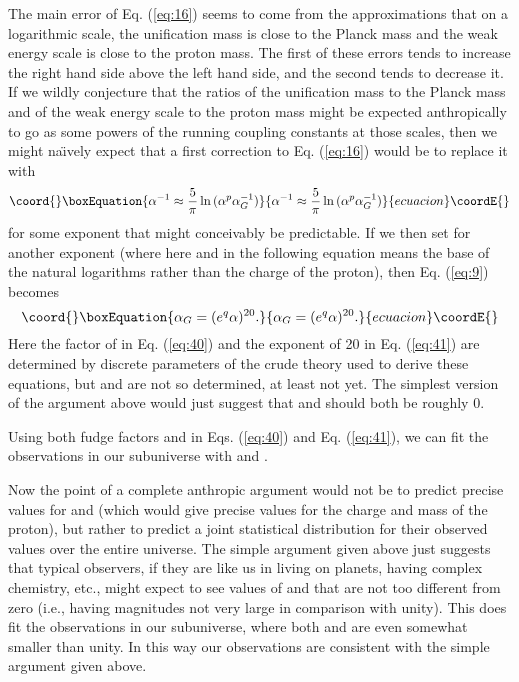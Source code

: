 \documentclass[a4paper,12pt]{article}
\begin{document}
	The main error of Eq. (\ref{eq:16}) seems to come from
the approximations that on a logarithmic scale,
the unification mass is close to the Planck mass
and the weak energy scale is close to the proton mass.
The first of these errors tends to increase the right hand side
above the left hand side, and the second tends to decrease it.
If we wildly conjecture that the ratios of the unification mass
to the Planck mass and of the weak energy scale to the proton mass
might be expected anthropically to go as some powers of the running
coupling constants at those scales,
then we might na\"{\i}vely expect that a first correction to
Eq. (\ref{eq:16}) would be to replace it with
 \begin{equation}\coord{}\boxEquation{
 \alpha^{-1} \approx {5\over\pi}\ln{(\alpha^p\alpha_G^{-1})}
 \label{eq:40}
 }{
 \alpha^{-1} \approx {5\over\pi}\ln{(\alpha^p\alpha_G^{-1})}
 }{ecuacion}\coordE{}\end{equation}
for some exponent \coordHE{} that might conceivably be predictable.
If we then set \coordHE{} for another exponent \coordHE{}
(where here and in the following equation \coordHE{} means the base
of the natural logarithms rather than the charge of the proton),
then Eq. (\ref{eq:9}) becomes
 \begin{equation}\coord{}\boxEquation{
 \alpha_G = (e^q \alpha)^{20}.
 \label{eq:41}
 }{
 \alpha_G = (e^q \alpha)^{20}.
 }{ecuacion}\coordE{}\end{equation}
Here the factor of \coordHE{} in Eq. (\ref{eq:40})
and the exponent of 20 in Eq. (\ref{eq:41})
are determined by discrete parameters of the crude theory
used to derive these equations,
but \coordHE{} and \coordHE{} are not so determined, at least not yet.
The simplest version of the argument above would
just suggest that \coordHE{} and \coordHE{} should both be roughly 0.

	Using both fudge factors \coordHE{} and \coordHE{}
in Eqs. (\ref{eq:40}) and Eq. (\ref{eq:41}),
we can fit the observations in our subuniverse
with \coordHE{} and \coordHE{}.

	Now the point of a complete anthropic argument
would not be to predict precise values for \coordHE{} and \coordHE{}
(which would give precise values for the charge and mass of the proton),
but rather to predict a joint statistical distribution for their
observed values over the entire universe.
The simple argument given above just suggests that typical observers,
if they are like us in living on planets, having complex chemistry, etc.,
might expect to see values of \coordHE{} and \coordHE{} that are not
too different from zero
(i.e., having magnitudes not very large in comparison with unity).
This does fit the observations in our subuniverse,
where both \coordHE{} and \coordHE{} are even somewhat smaller than unity.
In this way our observations are consistent with
the simple argument given above.
\end{document}
